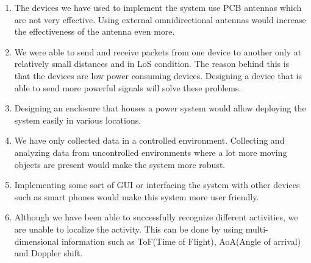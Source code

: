 \begin{enumerate}
  \item The devices we have used to implement the system use PCB antennas which are not very effective. Using external omnidirectional antennas would increase the effectiveness of the antenna even more.
  
  \item We were able to send and receive packets from one device to another only at relatively small distances and in LoS condition. The reason behind this is that the devices are low power consuming devices. Designing a device that is able to send more powerful signals will solve these problems. 

  \item Designing an enclosure that houses a power system would allow deploying the system easily in various locations.
  
  \item We have only collected data in a controlled environment. Collecting and analyzing data from uncontrolled environments where a lot more moving objects are present would make the system more robust.

  \item Implementing some sort of GUI or interfacing the system with other devices such as smart phones would make this system more user friendly.
  
  \item Although we have been able to successfully recognize different activities, we are unable to localize the activity. This can be done by using multi-dimensional information such as ToF(Time of Flight), AoA(Angle of arrival) and Doppler shift\cite{mDTrack}.
  
\end{enumerate}


